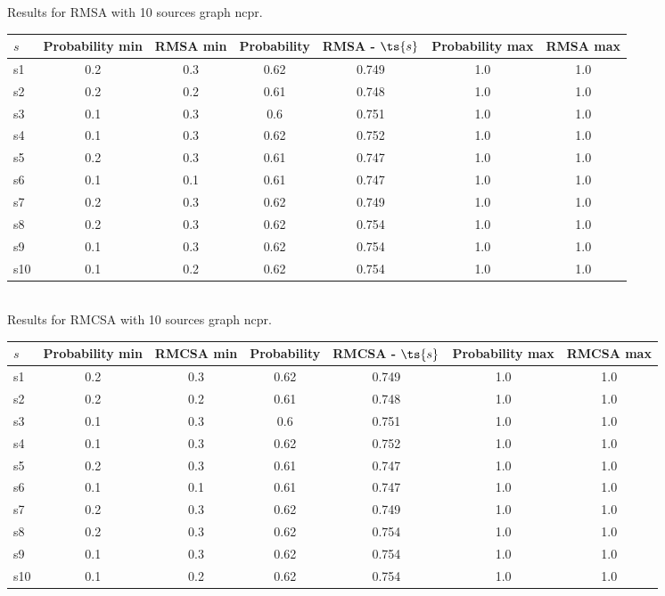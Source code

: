 \documentclass{article}
\begin{document}
\noindent Results for RMSA with 10 sources graph ncpr.

\noindent\begin{tabular}{|l|c|c|c|c|c|c|}
\hline
$s$& Probability min & RMSA min & Probability & RMSA - $\ts{s}$ & Probability max & RMSA max\\
\hline
s1 &0.2 & 0.3 & 0.62 & 0.749 & 1.0 & 1.0\\
\hline
s2 &0.2 & 0.2 & 0.61 & 0.748 & 1.0 & 1.0\\
\hline
s3 &0.1 & 0.3 & 0.6 & 0.751 & 1.0 & 1.0\\
\hline
s4 &0.1 & 0.3 & 0.62 & 0.752 & 1.0 & 1.0\\
\hline
s5 &0.2 & 0.3 & 0.61 & 0.747 & 1.0 & 1.0\\
\hline
s6 &0.1 & 0.1 & 0.61 & 0.747 & 1.0 & 1.0\\
\hline
s7 &0.2 & 0.3 & 0.62 & 0.749 & 1.0 & 1.0\\
\hline
s8 &0.2 & 0.3 & 0.62 & 0.754 & 1.0 & 1.0\\
\hline
s9 &0.1 & 0.3 & 0.62 & 0.754 & 1.0 & 1.0\\
\hline
s10 &0.1 & 0.2 & 0.62 & 0.754 & 1.0 & 1.0\\
\hline
\end{tabular}\\

\noindent Results for RMCSA with 10 sources graph ncpr.

\noindent\begin{tabular}{|l|c|c|c|c|c|c|}
\hline
$s$& Probability min & RMCSA min & Probability & RMCSA - $\ts{s}$ & Probability max & RMCSA max\\
\hline
s1 &0.2 & 0.3 & 0.62 & 0.749 & 1.0 & 1.0\\
\hline
s2 &0.2 & 0.2 & 0.61 & 0.748 & 1.0 & 1.0\\
\hline
s3 &0.1 & 0.3 & 0.6 & 0.751 & 1.0 & 1.0\\
\hline
s4 &0.1 & 0.3 & 0.62 & 0.752 & 1.0 & 1.0\\
\hline
s5 &0.2 & 0.3 & 0.61 & 0.747 & 1.0 & 1.0\\
\hline
s6 &0.1 & 0.1 & 0.61 & 0.747 & 1.0 & 1.0\\
\hline
s7 &0.2 & 0.3 & 0.62 & 0.749 & 1.0 & 1.0\\
\hline
s8 &0.2 & 0.3 & 0.62 & 0.754 & 1.0 & 1.0\\
\hline
s9 &0.1 & 0.3 & 0.62 & 0.754 & 1.0 & 1.0\\
\hline
s10 &0.1 & 0.2 & 0.62 & 0.754 & 1.0 & 1.0\\
\hline
\end{tabular}\\
\end{document}
